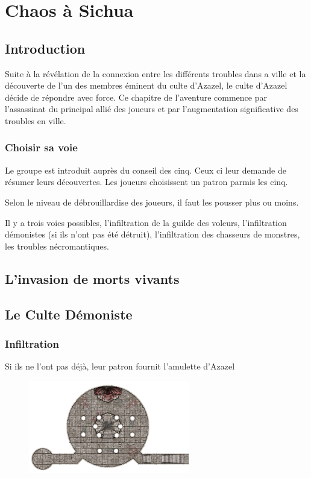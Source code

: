 \section{Chaos à Sichua}

\subsection*{Introduction}

Suite à la révélation de la connexion entre les différents troubles dans a ville et
la découverte de l'un des membres éminent du culte d'Azazel, le culte d'Azazel décide 
de répondre avec force. Ce chapitre de l'aventure commence par l'assassinat du 
principal allié des joueurs et par l'augmentation significative des troubles en ville.

\subsubsection*{Choisir sa voie}

Le groupe est introduit auprès du conseil des cinq. Ceux ci leur demande de 
résumer leurs découvertes. Les joueurs choisissent un patron parmis les cinq.

Selon le niveau de débrouillardise des joueurs, il faut les pousser plus ou moins.

Il y a trois voies possibles, l'infiltration de la guilde des voleurs, l'infiltration
démonistes (si ils n'ont pas été détruit), l'infiltration des chasseurs de monstres,
les troubles nécromantiques.

\subsection*{L'invasion de morts vivants}

\subsection*{Le Culte Démoniste}

\subsubsection*{Infiltration}
Si ils ne l'ont pas déjà, leur patron fournit l'amulette d'Azazel

\begin{figure}[htb!]
\center
\includegraphics[width=7cm]{Maps/Temple.png}
\end{figure}

